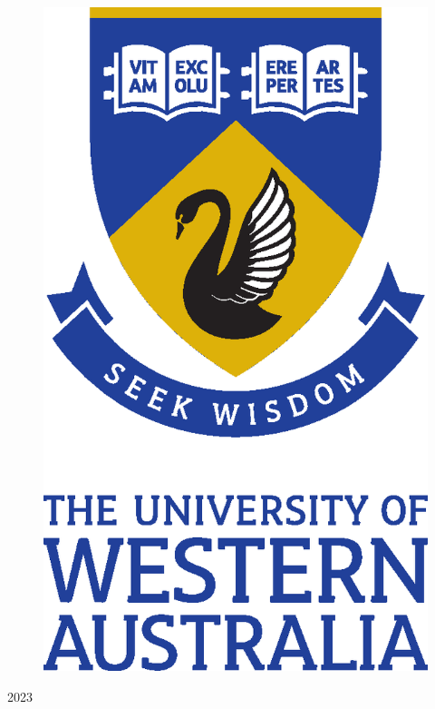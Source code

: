 \documentclass[12pt,a4paper]{report} %
\begin{document}
\begin{titlepage}
\begin{center}
        \begin{figure}[h]
            \centering{}
            \includegraphics[scale=0.6]{fig/etc/UWA_FORMAL_PORTRAIT_CMYK}
        \end{figure}

        \vspace*{\fill}
        2023
    \end{center}
\end{titlepage}

\shipout\null

\setcounter{page}{1}
\end{document}

